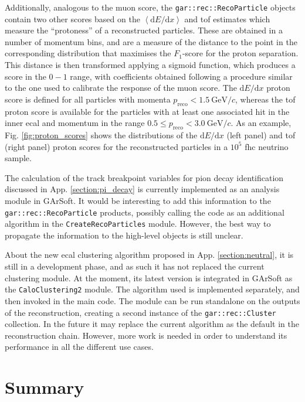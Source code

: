 Additionally, analogous to the muon score, the \texttt{gar::rec::RecoParticle} objects contain two other scores based on the $\left<\mathrm{d}E/\mathrm{d}x\right>$ and \gls{tof} estimates which measure the ``protoness'' of a reconstructed particles. These are obtained in a number of momentum bins, and are a measure of the distance to the point in the corresponding distribution that maximises the $F_{1}$-score for the proton separation. This distance is then transformed applying a sigmoid function, which produces a score in the $0-1$ range, with coefficients obtained following a procedure similar to the one used to calibrate the response of the muon score. The $\mathrm{d}E/\mathrm{d}x$ proton score is defined for all particles with momenta $p_{\mathrm{reco}} < 1.5~\mathrm{GeV}/c$, whereas the \gls{tof} proton score is available for the particles with at least one associated hit in the inner \gls{ecal} and momentum in the range $0.5 \leq p_{\mathrm{reco}} < 3.0~\mathrm{GeV}/c$. As an example, Fig. \ref{fig:proton_scores} shows the distributions of the $\mathrm{d}E/\mathrm{d}x$ (left panel) and \gls{tof} (right panel) proton scores for the reconstructed particles in a $10^{5}$ \gls{fhc} neutrino sample.

The calculation of the track breakpoint variables for pion decay identification discussed in App. \ref{section:pi_decay} is currently implemented as an analysis module in GArSoft. It would be interesting to add this information to the \texttt{gar::rec::RecoParticle} products, possibly calling the code as an additional algorithm in the \texttt{CreateRecoParticles} module. However, the best way to propagate the information to the high-level objects is still unclear.

About the new \gls{ecal} clustering algorithm proposed in App. \ref{section:neutral}, it is still in a development phase, and as such it has not replaced the current clustering module. At the moment, its latest version is integrated in GArSoft as the \texttt{CaloClustering2} module. The algorithm used is implemented separately, and then invoked in the main code. The module can be run standalone on the outputs of the reconstruction, creating a second instance of the \texttt{gar::rec::Cluster} collection. In the future it may replace the current algorithm as the default in the reconstruction chain. However, more work is needed in order to understand its performance in all the different use cases.

\section{Summary}

